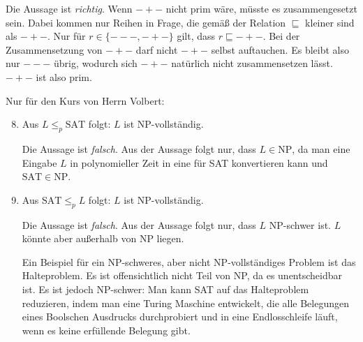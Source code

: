 \documentclass[11pt,a4paper]{article}
\begin{document}
\begin{loesung}
\begin{enumerate}
        Die Aussage ist \emph{richtig}.
        Wenn $-+-$ nicht prim wäre, müsste es zusammengesetzt sein.
        Dabei kommen nur Reihen in Frage, die gemäß der Relation $\sqsubseteq$ kleiner sind als $-+-$.
        Nur für $r \in \{---, -+-\}$ gilt, dass $r \sqsubseteq -+-$.
        Bei der Zusammensetzung von $-+-$ darf nicht $-+-$ selbst auftauchen.
        Es bleibt also nur $---$ übrig, wodurch sich $-+-$ natürlich nicht zusammensetzen lässt.
        $-+-$ ist also prim.
    \end{enumerate}
    Nur für den Kurs von Herrn Volbert:
    \begin{enumerate}
        \setcounter{enumi}{7}
        \item Aus $L \leq_p \mathrm{SAT}$ folgt: $L$ ist NP-vollständig.

        Die Aussage ist \emph{falsch}.
        Aus der Aussage folgt nur, dass $L \in \mathrm{NP}$, da man eine Eingabe $L$ in polynomieller Zeit in eine für SAT konvertieren kann und $\mathrm{SAT} \in \mathrm{NP}$.
        \item Aus $\mathrm{SAT} \leq_p L$ folgt: $L$ ist NP-vollständig.

        Die Aussage ist \emph{falsch}.
        Aus der Aussage folgt nur, dass $L$ NP-schwer ist.
        $L$ könnte aber außerhalb von NP liegen.

        Ein Beispiel für ein NP-schweres, aber nicht NP-vollständiges Problem ist das Halteproblem.
        Es ist offensichtlich nicht Teil von NP, da es unentscheidbar ist.
        Es ist jedoch NP-schwer:
        Man kann SAT auf das Halteproblem reduzieren, indem man eine Turing Maschine entwickelt, die alle Belegungen eines Boolschen Ausdrucks durchprobiert und in eine Endlosschleife läuft, wenn es keine erfüllende Belegung gibt.
    \end{enumerate}
\end{loesung}
\end{document}
